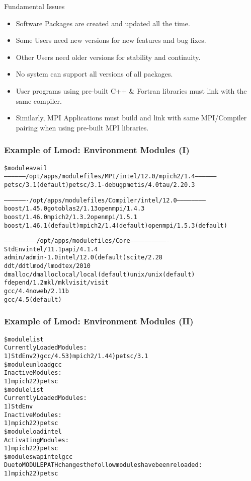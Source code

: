 \documentclass[dvipsnames,aspectratio=169]{beamer}
\begin{document}
\begin{frame}{Fundamental Issues}
  \begin{itemize}
    \item Software Packages are created and updated all the time.
    \item Some Users need new versions for new features and bug fixes.
    \item Other Users need older versions for stability and continuity.
    \item No system can support all versions of all packages.
    \item User programs using pre-built C++ \& Fortran libraries must link with the same compiler.
    \item Similarly, MPI Applications must build and link with same
      MPI/Compiler pairing when using pre-built MPI libraries.
  \end{itemize}
\end{frame}

\begin{frame}[fragile]
    \frametitle{Example of Lmod: Environment Modules (I)}
    {\tiny
\begin{alltt}
\$ {\color{blue} module avail}
------------------ /opt/apps/modulefiles/MPI/intel/12.0/mpich2/1.4 ------------------
  petsc/3.1 (default)    petsc/3.1-debug    pmetis/4.0    tau/2.20.3

------------------- /opt/apps/modulefiles/Compiler/intel/12.0 -----------------------
  boost/1.45.0              gotoblas2/1.13          openmpi/1.4.3
  boost/1.46.0              mpich2/1.3.2            openmpi/1.5.1
  boost/1.46.1 (default)    mpich2/1.4 (default)    openmpi/1.5.3 (default)

-------------------------- /opt/apps/modulefiles/Core -------------------------------
  StdEnv               intel/11.1               papi/4.1.4
  admin/admin-1.0      intel/12.0 (default)     scite/2.28
  ddt/ddt              lmod/lmod                tex/2010
  dmalloc/dmalloc      local/local (default)    unix/unix (default)
  fdepend/1.2          mkl/mkl                  visit/visit
  gcc/4.4              noweb/2.11b
  gcc/4.5 (default)
\end{alltt}
    }
\end{frame}

\begin{frame}[fragile]
    \frametitle{Example of Lmod: Environment Modules (II)}
    {\tiny
\begin{alltt}
{\color{blue}\$ module list}
Currently Loaded Modules:
  1) StdEnv  2) gcc/4.5  3) mpich2/1.4  4) petsc/3.1
{\color{blue}\$ module unload gcc}
Inactive Modules:
  1) mpich2  2) petsc
{\color{blue}\$ module list}
Currently Loaded Modules:
  1) StdEnv
Inactive Modules:
  1) mpich2  2) petsc
{\color{blue}\$ module load intel}
Activating Modules:
  1) mpich2  2) petsc
{\color{blue}\$ module swap intel gcc}
Due to MODULEPATH changes the follow modules have been reloaded:
  1) mpich2  2) petsc
\end{alltt}
    }
\end{frame}
\end{document}
